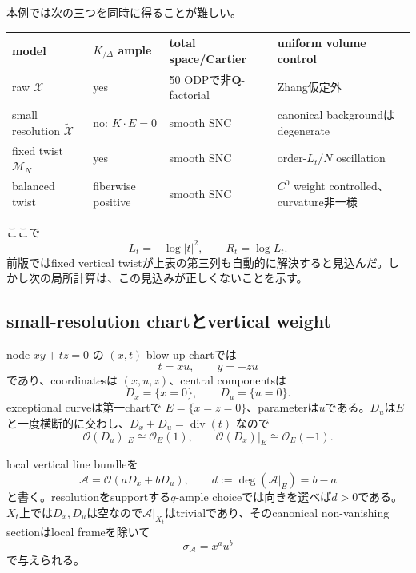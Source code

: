 \documentclass[11pt,a4paper]{ltjsarticle}
\theoremstyle{definition}
\theoremstyle{remark}
\begin{document}
本例では次の三つを同時に得ることが難しい。
\begin{center}
\small
\begin{tabular}{p{}p{}p{}p{}}
\toprule
model & $K_{/\Delta}$ ample & total space/Cartier & uniform volume control\\
\midrule
raw $\mathcal X$ & yes & 50 ODPで非$\mathbf Q$-factorial & Zhang仮定外\\
small resolution $\widetilde{\mathcal X}$ & no: $K\cdot E=0$ & smooth SNC & canonical backgroundはdegenerate\\
fixed twist $\mathcal M_N$ & yes & smooth SNC & order-$L_t/N$ oscillation\\
balanced twist & fiberwise positive & smooth SNC & $C^0$ weight controlled、curvature非一様\\
\bottomrule
\end{tabular}
\end{center}

ここで
\[
 L_t=-\log|t|^2,\qquad R_t=\log L_t.
\]
前版ではfixed vertical twistが上表の第三列も自動的に解決すると見込んだ。しかし次の局所計算は、この見込みが正しくないことを示す。

\subsection{small-resolution chartとvertical weight}

node $xy+tz=0$ の $(x,t)$-blow-up chartでは
\begin{equation}\label{eq:balanced-small-chart}
 t=xu,\qquad y=-zu
\end{equation}
であり、coordinatesは $(x,u,z)$、central componentsは
\[
 D_x=\{x=0\},\qquad D_u=\{u=0\}.
\]
exceptional curveは第一chartで $E=\{x=z=0\}$、parameterは$u$である。$D_u$は$E$と一度横断的に交わし、$D_x+D_u=\operatorname{div}(t)$ なので
\begin{equation}\label{eq:vertical-degrees}
 \mathcal O(D_u)|_E\cong\mathcal O_E(1),\qquad
 \mathcal O(D_x)|_E\cong\mathcal O_E(-1).
\end{equation}

local vertical line bundleを
\[
 \mathcal A=\mathcal O(aD_x+bD_u),
 \qquad d:=\deg(\mathcal A|_E)=b-a
\]
と書く。resolutionをsupportする$q$-ample choiceでは向きを選べば$d>0$である。$X_t$上では$D_x,D_u$は空なので$\mathcal A|_{X_t}$はtrivialであり、そのcanonical non-vanishing sectionはlocal frameを除いて
\[
 \sigma_{\mathcal A}=x^a u^b
\]
で与えられる。
\end{document}
